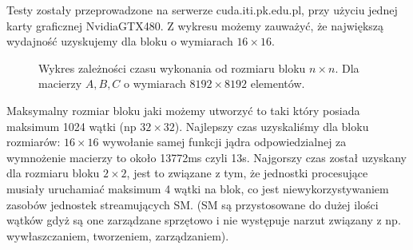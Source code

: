 \documentclass[a4paper,12pt]{article}
\begin{document}
Testy zostały przeprowadzone na serwerze cuda.iti.pk.edu.pl, przy użyciu jednej karty graficznej Nvidia\textregistered GTX480. Z wykresu możemy zauważyć, że największą wydajność uzyskujemy dla bloku o wymiarach \( 16 \times 16\). 

\begin{figure}

	\begin{center}

 		   		
 		
	\end{center}


    \caption{Wykres zależności czasu wykonania od rozmiaru bloku \(n \times n\). Dla macierzy \( A, B, C\) o wymiarach \(8192 \times 8192\) elementów.}
\end{figure}



Maksymalny rozmiar bloku jaki możemy utworzyć to taki który posiada maksimum 1024 wątki (np \( 32 \times 32\)). Najlepszy czas uzyskaliśmy dla bloku rozmiarów: \(16 \times 16\) wywołanie samej funkcji jądra odpowiedzialnej za wymnożenie macierzy to około 13772ms czyli 13s. 
Najgorszy czas został uzyskany dla rozmiaru bloku \(2 \times 2\), jest to związane z tym, że jednostki procesujące musiały uruchamiać maksimum 4 wątki na blok, co jest niewykorzystywaniem zasobów jednostek streamujących SM. 
(SM są przystosowane do dużej ilości wątków gdyż są one zarządzane sprzętowo i nie występuje narzut związany z np. wywłaszczaniem, tworzeniem, zarządzaniem).
\end{document}
